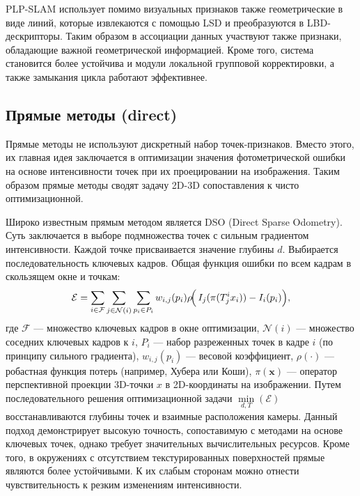PLP-SLAM использует помимо визуальных признаков также геометрические в виде линий,
которые извлекаются с помощью LSD и преобразуются в LBD-дескрипторы. Таким образом
в ассоциации данных участвуют также признаки, обладающие важной геометрической информацией.
Кроме того, система становится более устойчива и модули локальной групповой корректировки, а также
замыкания цикла работают эффективнее.


\subsection{Прямые методы (direct)}
Прямые методы не используют дискретный набор точек-признаков. Вместо этого, их главная
идея заключается в оптимизации значения фотометрической ошибки на основе интенсивности точек при их проецировании на изображения. 
Таким образом прямые методы сводят задачу 2D-3D сопоставления к чисто оптимизационной.


Широко известным прямым методом является DSO (Direct Sparse Odometry). Суть заключается
в выборе подмножества точек с сильным градиентом интенсивности. Каждой точке 
присваивается значение глубины $d$. Выбирается последовательность ключевых кадров.
Общая функция ошибки по всем кадрам в скользящем окне и точкам:
\begin{equation}
    \mathcal{E} = 
    \sum_{i \in \mathcal{F}} \sum_{j \in \mathcal{N}(i)} 
    \sum_{{p}_i \in P_i}
    w_{i,j}({p}_i) \rho\!\Bigl(\,
    I_j(\pi({T}_j^i {x}_i)) - I_i({p}_i)
    \Bigr),
\end{equation}
где  $\mathcal{F}$ --- множество ключевых кадров в окне оптимизации, $\mathcal{N}(i)$ ---
множество соседних ключевых кадров к $i$, $P_i$ --- набор разреженных 
точек в кадре $i$ (по принципу сильного градиента), $w_{i,j}({p}_i)$ --- 
весовой коэффициент, $\rho(\cdot)$ --- робастная функция потерь (например, 
Хубера или Коши), $\pi(\mathbf{x})$ --- оператор перспективной проекции 
3D-точки $x$ в 2D-координаты на изображении. Путем последовательного решения оптимизационной
задачи $\min\limits_{d, T}(\mathcal{E})$ восстанавливаются глубины точек и взаимные расположения 
камеры. Данный подход демонстрирует высокую точность, сопоставимую с
методами на основе ключевых точек, однако требует значительных вычислительных ресурсов.
Кроме того, в окружениях с отсутствием текстурированных поверхностей прямые являются
более устойчивыми. К их слабым сторонам можно отнести чувствительность к резким изменениям интенсивности.

